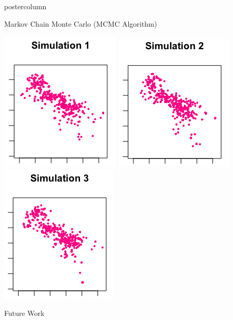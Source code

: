 \documentclass[final]{beamer}\usepackage[]{graphicx}\usepackage[]{color}
\begin{document}
{\begin{frame}
\begin{columns}
\begin{column}{.33\textwidth}
\begin{beamercolorbox}[center,wd=\textwidth]{postercolumn}
\begin{minipage}[T]{.97\textwidth}
{\begin{block}{Markov Chain Monte Carlo (MCMC Algorithm)}
\begin{itemize}
\vspace{0.5cm}
  \hspace{1cm}
  \includegraphics[scale=1.1]{simulation1.png}
  \hspace{1cm}
  \includegraphics[scale=1.1]{simulation2.png}
  \hspace{1cm}
  \includegraphics[scale=1.1]{simulation3.png}
  
\end{itemize}

\end{block}

\begin{block}{Future Work}



\end{block}}
\end{minipage}
\end{beamercolorbox}
\end{column}
\end{columns}
\end{frame}}
\end{document}
